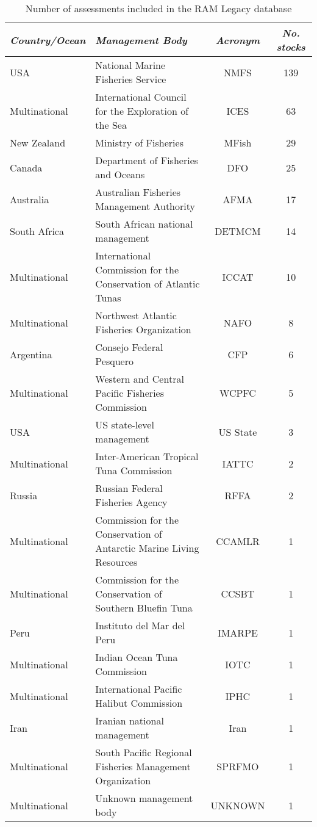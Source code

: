 \begin{table}[ht]
\begin{center}
\caption{Number of assessments included in the RAM Legacy database}
\label{tab:mgmt}
\begin{tabular}{p{3cm}p{5cm}cc}
\textit{Country/Ocean} & \textit{Management Body} & \textit{Acronym} & \textit{No. stocks} \\ \midrule
USA & National Marine Fisheries Service & NMFS & 139 \\ 
  Multinational & International Council for the Exploration of the Sea & ICES &  63 \\ 
  New Zealand & Ministry of Fisheries & MFish &  29 \\ 
  Canada & Department of Fisheries and Oceans & DFO &  25 \\ 
  Australia & Australian Fisheries Management Authority & AFMA &  17 \\ 
  South Africa & South African national management & DETMCM &  14 \\ 
  Multinational & International Commission for the Conservation of Atlantic Tunas & ICCAT &  10 \\ 
  Multinational & Northwest Atlantic Fisheries Organization & NAFO &   8 \\ 
  Argentina & Consejo Federal Pesquero & CFP &   6 \\ 
  Multinational & Western and Central Pacific Fisheries Commission & WCPFC &   5 \\ 
  USA & US state-level management & US State &   3 \\ 
  Multinational & Inter-American Tropical Tuna Commission & IATTC &   2 \\ 
  Russia & Russian Federal Fisheries Agency & RFFA &   2 \\ 
  Multinational & Commission for the Conservation of Antarctic Marine Living Resources & CCAMLR &   1 \\ 
  Multinational & Commission for the Conservation of Southern Bluefin Tuna & CCSBT &   1 \\ 
  Peru & Instituto del Mar del Peru & IMARPE &   1 \\ 
  Multinational & Indian Ocean Tuna Commission & IOTC &   1 \\ 
  Multinational & International Pacific Halibut Commission & IPHC &   1 \\ 
  Iran & Iranian national management & Iran &   1 \\ 
  Multinational & South Pacific Regional Fisheries Management Organization & SPRFMO &   1 \\ 
  Multinational & Unknown management body & UNKNOWN &   1 \\ 
   \hline
\end{tabular}
\end{center}
\end{table}

